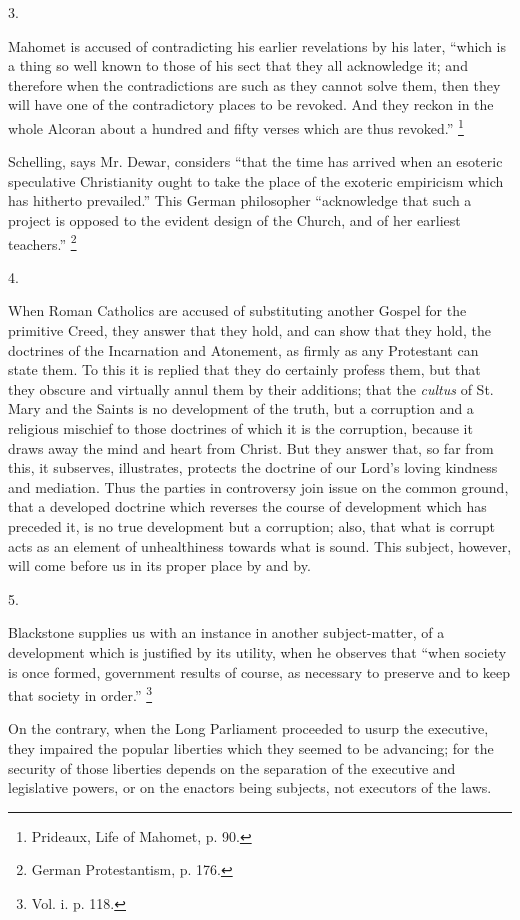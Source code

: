 3.

Mahomet is accused of contradicting his earlier
revelations by his later, ``which is a thing so well
known to those of his sect that they all acknowledge it;
and therefore when the contradictions are such as they
cannot solve them, then they will have one of the
contradictory places to be revoked. And they reckon in
the whole Alcoran about a hundred and fifty verses which
are thus revoked.'' \footnote{Prideaux, Life of Mahomet, p.
90.}

Schelling, says Mr. Dewar, considers ``that the
time has arrived when an esoteric speculative
Christianity ought to take the place of the exoteric
empiricism which has hitherto prevailed.'' This
German philosopher ``acknowledge that such a project
is opposed to the evident design of the Church, and of
her earliest teachers.'' \footnote{German Protestantism, p. 176.}

4.

When Roman Catholics are accused of substituting
another Gospel for the primitive Creed, they answer that
they hold, and can show that they hold, the doctrines of
the Incarnation and Atonement, as firmly as any
Protestant can state them. To this it is replied that
they do certainly profess them, but that they obscure and
virtually annul them by their additions; that the \emph{cultus}
of St. Mary and the Saints is no development of the
truth, but a corruption and a religious mischief to those
doctrines of which it is the corruption, because it draws
away the mind and heart from Christ. But they answer
that, so far from this, it subserves, illustrates,
protects the doctrine of our Lord's loving kindness and
mediation. Thus the parties in controversy join issue on
the common ground, that a developed doctrine which
reverses the course of development which has preceded it,
is no true development but a corruption; also, that what
is corrupt acts as an element of unhealthiness towards
what is sound. This subject, however, will come before us
in its proper place by and by.

5.

Blackstone supplies us with an instance in another
subject-matter, of a development which is justified by
its utility, when he observes that ``when society is
once formed, government results of course, as necessary
to preserve and to keep that society in order.'' \footnote{Vol. i. p. 118.}

On the contrary, when the Long Parliament proceeded to
usurp the executive, they impaired the popular liberties which they seemed to be advancing; for the security of
those liberties depends on the separation of the
executive and legislative powers, or on the enactors
being subjects, not executors of the laws.


